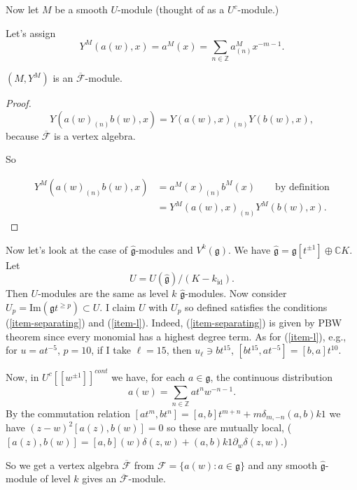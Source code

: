 \medskip\noindent
Now let $M$ be a smooth $U$-module
(thought of as a $U^c$-module.)

Let's assign
$$
Y^M(a(w),x)=a^M(x)=\sum_{n \in
\mathbb{Z}}a^M_{(n)}x^{-m-1}.
$$

\begin{proposition}
\label{proposition-smooth-f-module}
$(M,Y^M)$ is an
$\overline{\mathcal{F}}$-module.
\end{proposition}

\begin{proof}
$$
Y(a(w)_{(n)}b(w),x)=Y(a(w),x)_{(n)}Y(b(w),x),
$$
because $\overline{\mathcal{F}}$ is a vertex
algebra.

So

$$
\begin{aligned}
Y^M(a(w)_{(n)}b(w),x)&=a^M(x)_{(n)}b^M(x)
\qquad
\text{by definition}\\
&=Y^M(a(w),x)_{(n)}Y^M(b(w),x).
\end{aligned}
$$
\end{proof}


\medskip\noindent
Now  let's look at the case of
$\hat{\mathfrak{g}}$-modules and
$V^k(\mathfrak{g})$.
We have
$\hat{\mathfrak{g}}=\mathfrak{g}[t^{\pm
1}] \oplus \mathbb{C}K$.
Let
$$
U=U(\hat{\mathfrak{g}})/(K-k_\text{id}).
$$
Then $U$-modules are the same as level $k$
$\hat{\mathfrak{g}}$-modules.
Now consider
$U_p=\text{Im}(\mathfrak{g}t^{\geq p})\subset
U$.
I claim $U$ with $U_p$ so defined satisfies
the conditions
(\ref{item-separating}) and (\ref{item-l}).
Indeed, (\ref{item-separating}) is given by
PBW theorem
since every monomial has a highest degree
term.
As for (\ref{item-l}), e.g., for $u=at^{-5}$,
$p=10$, if I take
$\ell=15$, then $u_\ell \ni bt^{15}$,
$[bt^{15},at^{-5}]=[b,a]t^{10}$.

Now, in $U^c[[w^{\pm 1}]]^{cont}$ we have,
for each
$a \in \mathfrak{g}$, the continuous
distribution
$$
a(w)=\sum_{n \in \mathbb{Z}}at^n w^{-n-1}.
$$
By the commutation relation
$[at^m,bt^n]=[a,b]t^{m+n}+m\delta_{m,-n}(a,b)
k
1$
we have $(z-w)^2[a(z),b(w)]=0$
so these are mutually local,
($[a(z),b(w)]=[a,b](w)\delta(z,w)+(a,b)k 1
\partial_w \delta(z,w)$.)

So we get a vertex algebra
$\overline{\mathcal{F}}$
from $\mathcal{F}=\{a(w):a \in
\mathfrak{g}\}$
and any smooth  $\hat{\mathfrak{g}}$-module
of level $k$ gives
an $\overline{\mathcal{F}}$-module.

